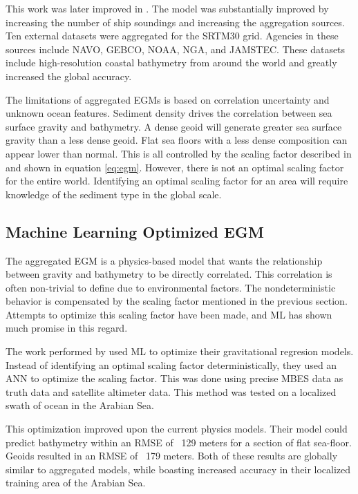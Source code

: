 \par 
This work was later improved in \cite{becker2009global}.
The model was substantially improved by increasing the number of ship soundings and increasing the aggregation sources.
Ten external datasets were aggregated for the SRTM30 grid.
Agencies in these sources include \ac{NAVO}, \ac{GEBCO}, \ac{NOAA}, \ac{NGA}, and \ac{JAMSTEC}.
These datasets include high-resolution coastal bathymetry from around the world and greatly increased the global accuracy.

\par
The limitations of aggregated \ac{EGM}s is based on correlation uncertainty and unknown ocean features.
Sediment density drives the correlation between sea surface gravity and bathymetry.
A dense geoid will generate greater sea surface gravity than a less dense geoid.
Flat sea floors with a less dense composition can appear lower than normal.
This is all controlled by the scaling factor described in \cite{smith1994bathymetric} and shown in equation \ref{eq:egm}. 
However, there is not an optimal scaling factor for the entire world.
Identifying an optimal scaling factor for an area will require knowledge of the sediment type in the global scale.


\subsection{Machine Learning Optimized \ac{EGM}}
The aggregated \ac{EGM} is a physics-based model that wants the relationship between gravity and bathymetry to be directly correlated.
This correlation is often non-trivial to define due to environmental factors.
The nondeterministic behavior is compensated by the scaling factor mentioned in the previous section.
Attempts to optimize this scaling factor have been made, and \ac{ML} has shown much promise in this regard.

\par
The work performed by \cite{jena2012prediction} used \ac{ML} to optimize their gravitational regresion models.
Instead of identifying an optimal scaling factor deterministically, they used an \ac{ANN} to optimize the scaling factor.
This was done using precise \ac{MBES} data as truth data and satellite altimeter data.
This method was tested on a localized swath of ocean in the Arabian Sea.

\par
This optimization improved upon the current physics models.
Their model could predict bathymetry within an \ac{RMSE} of ~129 meters for a section of flat sea-floor.
Geoids resulted in an \ac{RMSE} of ~179 meters.
Both of these results are globally similar to aggregated models, while boasting increased accuracy in their localized training area of the Arabian Sea.

